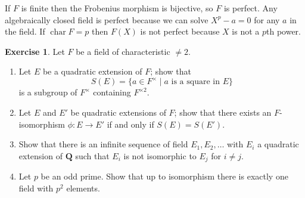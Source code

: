 \documentclass[11pt]{amsart}
\theoremstyle{definition}
\newtheorem{e}[theo]{Exercise}
\def\QQ{\mathbf{Q}}
\begin{document}
If $F$ is finite then the Frobenius morphism is bijective, so $F$ is perfect.
Any algebraically closed field is perfect because we can solve $X^p - a = 0$ for any $a$ in the field.
If $\operatorname{char} F = p$ then $F(X)$ is not perfect because $X$ is not a $p$th power.



\begin{e}
Let $F$ be a field of characteristic $\not= 2$.
\begin{enumerate}
\item
Let $E$ be a quadratic extension of $F$; show that
\[
S(E) = \{ a \in F^\times \mid \text{$a$ is a square in $E$} \}
\]
is a subgroup of $F^\times$ containing $F^{\times 2}$.

\item
Let $E$ and $E'$ be quadratic extensions of $F$; show that there exists an $F$-isomorphism $\phi : E \to E'$ if and only if $S(E) = S(E')$.

\item
Show that there is an infinite sequence of field $E_1, E_2, \ldots$ with $E_i$ a quadratic extension of $\QQ$ such that $E_i$ is not isomorphic to $E_j$ for $i \not= j$.

\item
Let $p$ be an odd prime.
Show that up to isomorphism there is exactly one field with $p^2$ elements.
\end{enumerate}
\end{e}
\end{document}
